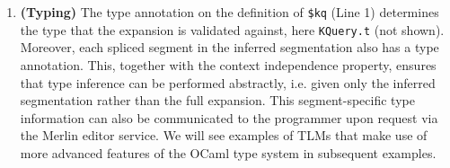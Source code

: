 \documentclass[acmsmall,review,anonymous]{acmart}\settopmatter{printfolios=true,printccs=false,printacmref=false}
\newcommand{\li}[1]{\lstinline[basicstyle=\ttfamily\fontsize{9pt}{1em}\selectfont]{#1}}
\begin{document}
\begin{enumerate}[leftmargin=12pt]
\item[\CIRCLE] \textbf{(Typing)} The type annotation on the definition of \li{$kq} (Line 1) determines the type that the expansion is validated against, here \li{KQuery.t} (not shown). Moreover, each spliced segment in the inferred segmentation also has  a type annotation. This, together with the context independence property, ensures that type inference can be performed abstractly, i.e. given only the inferred segmentation rather than the full expansion. This segment-specific type information can also be communicated to the programmer upon request via the Merlin editor service. We will see examples of TLMs that make use of more advanced features of the OCaml type system in subsequent examples. %
\end{enumerate}
\end{document}
